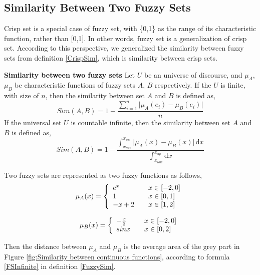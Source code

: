 \subsection{Similarity Between Two Fuzzy Sets}
\label{sec:fuzzySim}
Crisp set is a special case of fuzzy set, with \{0,1\} as the range of its characteristic function, rather than [0,1]. In other words, fuzzy set is a generalization of crisp set. According to this perspective, we generalized the similarity between fuzzy sets from definition \ref{CrispSim}, which is similarity between crisp sets.

\begin{defin}\textbf{Similarity between two fuzzy sets}\label{FuzzySim}
Let $U$ be an universe of discourse, and $\mu_{A}$, $\mu_{B}$ be characteristic functions of fuzzy sets $A$, $B$ respectively. If the $U$ is finite, with size of $n$, then the similarity between set $A$ and $B$ is defined as,
\begin{equation}\label{FSFinite}
Sim(A,B) =1- \frac{\sum_{i=1}^{n} \lvert \mu_{A}(e_i) - \mu_{B}(e_i) \rvert}{n}
\end{equation}
If the universal set $U$ is countable infinite, then the similarity between set $A$ and $B$ is defined as,
\begin{equation}\label{FSInfinite}
Sim(A,B) =1- \frac{\int_{x_{low}}^{x_{up}}\lvert \mu_{A}(x) - \mu_{B}(x) \rvert\, \mathrm{d}x}{\int_{x_{low}}^{x_{up}}\mathrm{d}x}
\end{equation}
\end{defin}
\begin{ex}
Two fuzzy sets are represented as two fuzzy functions as follows,
\[
  \mu_{A}(x) = \left\{ 
  \begin{array}{l l}
    e^{x} & \quad x \in [-2,0]\\
    1 & \quad x \in [0,1]\\
    -x+2 & \quad x \in [1,2]\\
  \end{array} \right.
\]

\[
  \mu_{B}(x) = \left\{ 
  \begin{array}{l l}
    - \frac{x}{2} & \quad x \in [-2,0]\\
    sin x & \quad x \in [0,2]\\
   \end{array} \right.
\]



Then the distance between $\mu_{A}$ and $\mu_{B}$ is the average area of the grey part in Figure \ref{fig:Similarity between continuous functions}, according to formula \eqref{FSInfinite} in definition \ref{FuzzySim}.
\end{ex}